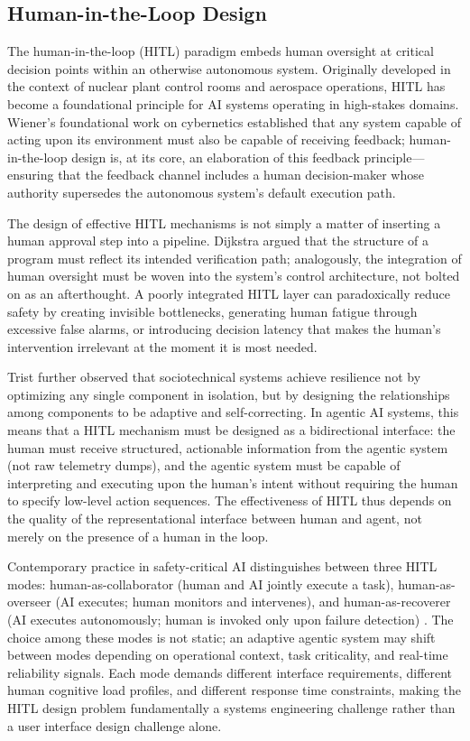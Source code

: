 \subsection{Human-in-the-Loop Design}

The human-in-the-loop (HITL) paradigm embeds human oversight at critical decision points within an otherwise autonomous system. Originally developed in the context of nuclear plant control rooms and aerospace operations, HITL has become a foundational principle for AI systems operating in high-stakes domains. Wiener's foundational work on cybernetics \cite{wiener1948} established that any system capable of acting upon its environment must also be capable of receiving feedback; human-in-the-loop design is, at its core, an elaboration of this feedback principle---ensuring that the feedback channel includes a human decision-maker whose authority supersedes the autonomous system's default execution path.

The design of effective HITL mechanisms is not simply a matter of inserting a human approval step into a pipeline. Dijkstra \cite{dijkstra1982} argued that the structure of a program must reflect its intended verification path; analogously, the integration of human oversight must be woven into the system's control architecture, not bolted on as an afterthought. A poorly integrated HITL layer can paradoxically reduce safety by creating invisible bottlenecks, generating human fatigue through excessive false alarms, or introducing decision latency that makes the human's intervention irrelevant at the moment it is most needed.

Trist \cite{tristr81} further observed that sociotechnical systems achieve resilience not by optimizing any single component in isolation, but by designing the relationships among components to be adaptive and self-correcting. In agentic AI systems, this means that a HITL mechanism must be designed as a bidirectional interface: the human must receive structured, actionable information from the agentic system (not raw telemetry dumps), and the agentic system must be capable of interpreting and executing upon the human's intent without requiring the human to specify low-level action sequences. The effectiveness of HITL thus depends on the quality of the representational interface between human and agent, not merely on the presence of a human in the loop.

Contemporary practice in safety-critical AI distinguishes between three HITL modes: human-as-collaborator (human and AI jointly execute a task), human-as-overseer (AI executes; human monitors and intervenes), and human-as-recoverer (AI executes autonomously; human is invoked only upon failure detection) \cite{bansal2019}. The choice among these modes is not static; an adaptive agentic system may shift between modes depending on operational context, task criticality, and real-time reliability signals. Each mode demands different interface requirements, different human cognitive load profiles, and different response time constraints, making the HITL design problem fundamentally a systems engineering challenge rather than a user interface design challenge alone.

